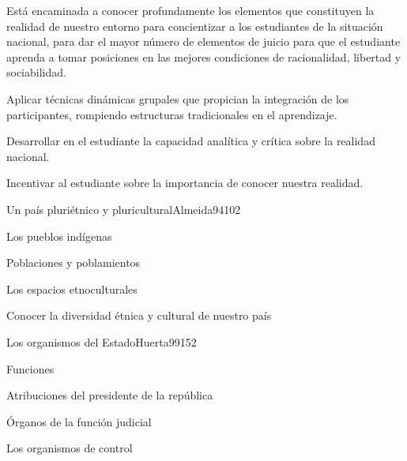 \begin{syllabus}


\begin{justification}
Está encaminada a conocer profundamente los elementos que constituyen la realidad de 
nuestro entorno para concientizar a los estudiantes de la situación nacional, 
para dar el mayor número de elementos de juicio para que el estudiante aprenda a tomar 
posiciones en las mejores condiciones de racionalidad, libertad y sociabilidad.
\end{justification}

\begin{goals}
\item Aplicar técnicas dinámicas grupales que propician la integración de los participantes, rompiendo estructuras tradicionales en el aprendizaje.
\item Desarrollar en el estudiante la capacidad analítica y crítica sobre la realidad nacional.
\item Incentivar al estudiante sobre la importancia de conocer nuestra realidad.
\end{goals}

\begin{outcomes}
\end{outcomes}

\begin{unit}{Un país pluriétnico y pluricultural}{Almeida94}{10}{2}
   \begin{topics}
	\item Los pueblos indígenas
	\item Poblaciones y poblamientos
	\item Los espacios etnoculturales
   \end{topics}

   \begin{unitgoals}
      \item Conocer la diversidad étnica y cultural de nuestro país
   \end{unitgoals}
\end{unit}

\begin{unit}{Los organismos del Estado}{Huerta99}{15}{2}
   \begin{topics}
      \item Funciones
	\item Atribuciones del presidente de la república
	\item Órganos de la función judicial
	\item Los organismos de control
  \end{topics}


\end{unit}
\end{syllabus}
